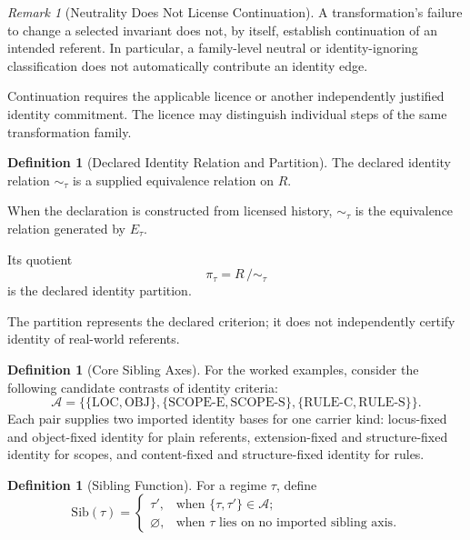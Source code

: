 \documentclass[11pt]{article}
\theoremstyle{plain}
\theoremstyle{definition}
\newtheorem{definition}[theorem]{Definition}
\theoremstyle{remark}
\newtheorem{remark}[theorem]{Remark}
\newcommand{\LOC}{\ensuremath{\mathrm{LOC}}}
\newcommand{\OBJ}{\ensuremath{\mathrm{OBJ}}}
\newcommand{\SCOPEE}{\ensuremath{\mathrm{SCOPE\text{-}E}}}
\newcommand{\SCOPES}{\ensuremath{\mathrm{SCOPE\text{-}S}}}
\newcommand{\RULEC}{\ensuremath{\mathrm{RULE\text{-}C}}}
\newcommand{\RULES}{\ensuremath{\mathrm{RULE\text{-}S}}}
\newcommand{\Sib}{\ensuremath{\mathrm{Sib}}}
\begin{document}
\begin{remark}[Neutrality Does Not License Continuation]
  \label{oi.rem.neutral}
  A transformation's failure to change a selected invariant
  does not, by itself, establish continuation of an intended
  referent. In particular, a family-level neutral or
  identity-ignoring classification does not automatically
  contribute an identity edge.

  Continuation requires the applicable licence or another
  independently justified identity commitment.
  The licence may distinguish individual steps of the same
  transformation family.
\end{remark}

\begin{definition}[Declared Identity Relation and Partition]
  \label{oi.def.declared}
  The declared identity relation \(\sim_{\tau}\) is a
  supplied equivalence relation on \(R\).

  When the declaration is constructed from licensed history,
  \(\sim_{\tau}\) is the equivalence relation generated
  by \(E_{\tau}\).

  Its quotient
  \[
    \pi_{\tau}
    =
    R\,/\!\sim_{\tau}
  \]
  is the declared identity partition.

  The partition represents the declared criterion;
  it does not independently certify identity of
  real-world referents.
\end{definition}

\begin{definition}[Core Sibling Axes]
  \label{oi.def.axes}
  For the worked examples, consider the following
  candidate contrasts of identity criteria:
  \[
    \mathcal{A}
    =
    \bigl\{
    \{\LOC,\OBJ\},
    \{\SCOPEE,\SCOPES\},
    \{\RULEC,\RULES\}
    \bigr\}.
  \]
  Each pair supplies two imported identity bases for one carrier kind:
  locus-fixed and object-fixed identity for plain referents,
  extension-fixed and structure-fixed identity for scopes,
  and content-fixed and structure-fixed identity for rules.
\end{definition}

\begin{definition}[Sibling Function]
  \label{oi.def.sibling}
  For a regime \(\tau\), define
  \[
    \Sib(\tau)
    =
    \begin{cases}
      \tau',
       & \text{when }\{\tau,\tau'\}\in\mathcal{A};
      \\
      \varnothing,
       & \text{when \(\tau\) lies on no imported sibling axis.}
    \end{cases}
  \]
\end{definition}
\end{document}

